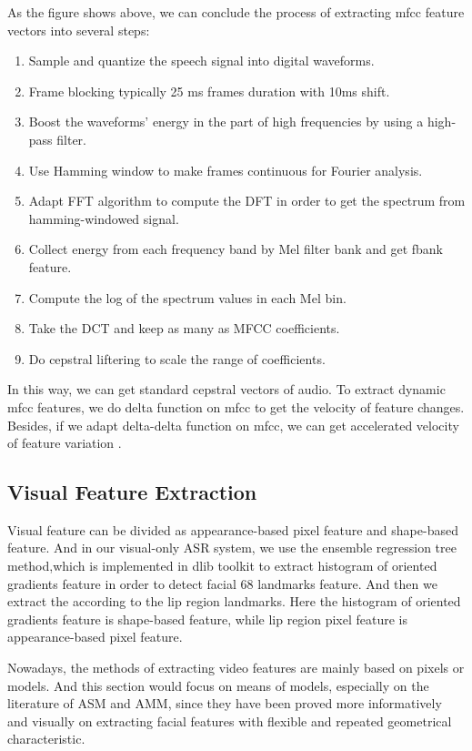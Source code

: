As the figure shows above, we can conclude the process of extracting mfcc feature vectors into several steps:
\begin{enumerate}
\item Sample and quantize the speech signal into digital waveforms.
\item Frame blocking typically 25 ms frames duration with 10ms shift.
\item Boost the waveforms’ energy in the part of high frequencies by using a high-pass filter. 
\item Use Hamming window to make frames continuous for Fourier analysis.
\item Adapt FFT algorithm to compute the DFT in order to get the spectrum from hamming-windowed signal.
\item Collect energy from each frequency band by Mel filter bank and get fbank feature.
\item Compute the log of the spectrum values in each Mel bin.
\item Take the DCT and keep as many as MFCC coefficients.
\item Do cepstral liftering to scale the range of coefficients.
\end{enumerate}
In this way, we can get standard cepstral vectors of audio. To extract dynamic mfcc features, we do delta function on mfcc to get the velocity of feature changes. Besides, if we adapt delta-delta function on mfcc, we can get accelerated velocity of feature variation .



\subsection{Visual Feature Extraction}
Visual feature can be divided as appearance-based pixel feature and shape-based feature. And in our visual-only ASR system, we use the ensemble regression tree method\cite{Reference8},which is implemented in dlib toolkit to extract histogram of oriented gradients feature\cite{Reference9} in order to detect facial 68 landmarks feature. And then we extract the according to the lip region landmarks. Here the histogram of oriented gradients feature is shape-based feature, while lip region pixel feature is appearance-based pixel feature.

Nowadays, the methods of extracting video features are mainly based on pixels or models. And this section would focus on means of models, especially on the literature of ASM and AMM, since they have been proved more informatively and visually on extracting facial features with flexible and repeated geometrical characteristic.

